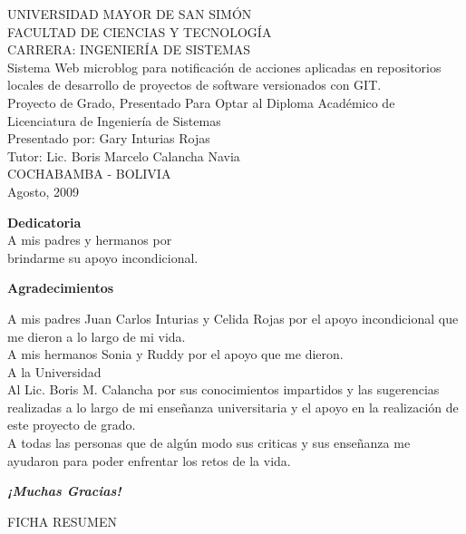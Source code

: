 \documentclass[letterpaper, 12pt,double,graphicx,caption,rotating]{report}
\begin{document}
\begin{titlepage}
\newpage
\begin{center}
UNIVERSIDAD MAYOR DE SAN SIMÓN\\
FACULTAD DE CIENCIAS Y TECNOLOGÍA\\
CARRERA: INGENIERÍA DE SISTEMAS\\[3cm]
{\Large Sistema Web microblog para notificación de acciones aplicadas en repositorios locales de desarrollo de proyectos de software versionados con GIT.}\\[2cm]
{\Large Proyecto de Grado, Presentado Para Optar al Diploma Académico de Licenciatura de Ingeniería de Sistemas}\\[2cm]
{\Large Presentado por: Gary Inturias Rojas}\\[1cm]
{\Large Tutor: Lic. Boris Marcelo Calancha Navia }\\[2PT]
COCHABAMBA - BOLIVIA\\
Agosto, 2009
\end{center}
\newpage

\begin{flushright}
    {\Large \textbf{Dedicatoria}}\\[1cm]
    A mis padres y hermanos por\\ brindarme su apoyo incondicional. \\
\end{flushright}
\newpage
\begin{center}
{\Large \textbf{Agradecimientos}}\\[2cm]
{\leftskip=8cm
A mis padres Juan Carlos Inturias y Celida Rojas por el apoyo incondicional que me dieron a lo largo de mi vida.\\
A mis hermanos Sonia y Ruddy por el apoyo que me dieron.\\
A la Universidad\\
Al Lic. Boris M. Calancha por sus conocimientos impartidos y las sugerencias realizadas a lo largo de mi enseñanza universitaria y el apoyo en la realización de este proyecto de grado.\\
A todas las personas que de algún modo sus criticas y sus enseñanza me ayudaron para poder enfrentar los retos de la vida.\\[3cm]
\par}
\textbf{\textit{¡Muchas Gracias!}}



\end{center}

\newpage
\begin{center}
 {\Large FICHA RESUMEN}\\
\end{center}


\end{titlepage}
\end{document}
